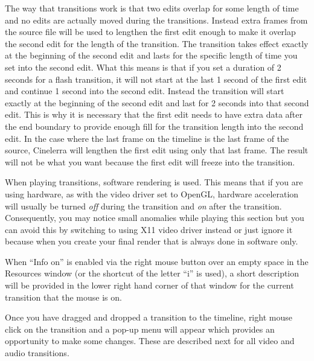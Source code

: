 The way that transitions work is that two edits overlap for some length of time and no edits are actually moved during the transitions.
Instead extra frames from the source file will be used to lengthen the first edit enough to make it overlap the second edit for the length of the transition. The transition takes effect exactly at the beginning of the second edit and lasts for the specific length of time you set into the second edit. 
What this means is that if you set a duration of 2 seconds for a flash transition, it will not start at the last 1 second of the first edit and continue 1 second into the second edit. Instead the transition will start exactly at the beginning of the second edit and last for 2 seconds into that second edit. 
This is why it is necessary that the first edit needs to have extra data after the end boundary to provide enough fill for the transition length into the second edit.
In the case where the last frame on the timeline is the last frame of the source, Cinelerra will lengthen the first edit using only that last frame.  The result will not be what you want because the first edit will freeze into the transition.

When playing transitions, software rendering is used.  This means that if you are using hardware, as with the video driver set to OpenGL, hardware acceleration will usually be turned \textit{off} during the transition and \textit{on} after the transition. Consequently, you may notice small anomalies while playing this section but you can avoid this by switching to using X11 video driver instead or just ignore it because when you create your final render that is always done in software only.
    
When “Info on” is enabled via the right mouse button over an empty space in the Resources window (or the shortcut of the letter “i” is used), a short description will be provided in the lower right hand corner of that window for the current transition that the mouse is on.

Once you have dragged and dropped a transition to the timeline, right mouse click on the transition and a pop-up menu will appear which provides an opportunity to make some changes.  These are described next for all video and audio transitions. 

